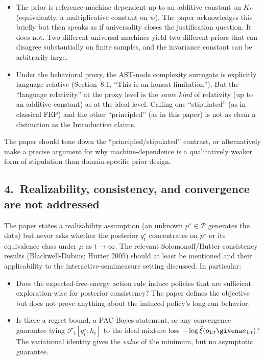\documentclass[11pt]{article}
\begin{document}
\begin{itemize}[leftmargin=*]
\item The prior is reference-machine dependent up to an additive constant on $K_U$ (equivalently, a multiplicative constant on $w$). The paper acknowledges this briefly but then speaks as if universality closes the justification question. It does not. Two different universal machines yield two different priors that can disagree substantially on finite samples, and the invariance constant can be arbitrarily large.
\item Under the behavioral proxy, the AST-node complexity surrogate is explicitly language-relative (Section~8.1, ``This is an honest limitation''). But the ``language relativity'' at the proxy level is the \emph{same kind} of relativity (up to an additive constant) as at the ideal level. Calling one ``stipulated'' (as in classical FEP) and the other ``principled'' (as in this paper) is not as clean a distinction as the Introduction claims.
\end{itemize}

The paper should tone down the ``principled/stipulated'' contrast, or alternatively make a precise argument for why machine-dependence is a qualitatively weaker form of stipulation than domain-specific prior design.

\subsection*{4.\ Realizability, consistency, and convergence are not addressed}

The paper states a realizability assumption (an unknown $p^\star \in \mathcal{P}$ generates the data) but never asks whether the posterior $q_t^\star$ concentrates on $p^\star$ or its equivalence class under $\mu$ as $t\to\infty$. The relevant Solomonoff/Hutter consistency results (Blackwell-Dubins; Hutter 2005) should at least be mentioned and their applicability to the interactive-semimeasure setting discussed. In particular:

\begin{itemize}[leftmargin=*]
\item Does the expected-free-energy action rule induce policies that are sufficient exploration-wise for posterior consistency? The paper defines the objective but does not prove anything about the induced policy's long-run behavior.
\item Is there a regret bound, a PAC-Bayes statement, or any convergence guarantee tying $\mathcal{F}_t[q_t^\star;h_t]$ to the ideal mixture loss $-\log\bar\xi(o_{1:t}\givena a_{1:t})$? The variational identity gives the \emph{value} of the minimum, but no asymptotic guarantee.
\end{itemize}
\end{document}
